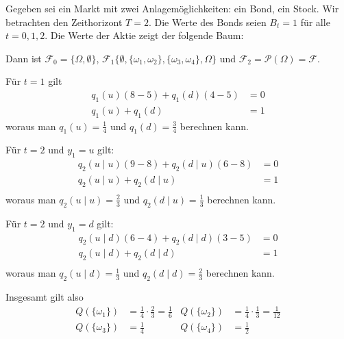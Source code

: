 \documentclass[a4paper,twoside,DIV15,BCOR12mm]{scrbook}
\newcommand{\cF}{\mathcal F}
\begin{document}
\begin{beispiel}
Gegeben sei ein Markt mit zwei Anlagemöglichkeiten: ein Bond, ein Stock. Wir betrachten den Zeithorizont $T=2$. Die Werte des Bonds seien $B_t=1$ für alle $t=0,1,2$. Die Werte der Aktie zeigt der folgende Baum:
\begin{center}
\end{center}

Dann ist $\cF_0=\{\Omega,\emptyset\}$, $\cF_1\{\emptyset,\{\omega_1,\omega_2\}, \{\omega_3,\omega_4\},\Omega\}$ und $\cF_2=\mathcal P(\Omega)=\cF$.

Für $t=1$ gilt
\begin{align*}
q_1(u)(8-5) + q_1(d) (4-5) &= 0 \\
q_1(u) + q_1(d) &= 1
\end{align*}
woraus man $q_1(u) = \frac14$ und $q_1(d)=\frac34$ berechnen kann.

Für $t=2$ und $y_1=u$ gilt:
\begin{align*}
q_2(u\mid u) (9-8) + q_2(d\mid u)(6-8) &= 0  \\
q_2(u\mid u)  + q_2(d\mid u) &= 1  \\
\end{align*}
woraus man $q_2(u\mid u) = \frac23$ und $q_2(d\mid u) = \frac 13$ berechnen kann.

Für $t=2$ und $y_1=d$ gilt:
\begin{align*}
q_2(u\mid d) (6-4) + q_2(d\mid d)(3-5) &= 0  \\
q_2(u\mid d)  + q_2(d\mid d) &= 1  \\
\end{align*}
woraus man $q_2(u\mid d) = \frac13$ und $q_2(d\mid d) = \frac 23$ berechnen kann.

Insgesamt gilt also
\begin{align*}
Q(\{\omega_1\}) &= \frac 14 \cdot \frac 23 = \frac 16 & Q(\{\omega_2\}) &= \frac14\cdot\frac 13 = \frac 1{12} \\
Q(\{\omega_3\}) &= \frac 14 & Q(\{\omega_4\}) &= \frac 1{2} 
\end{align*}
\end{beispiel}
\end{document}
